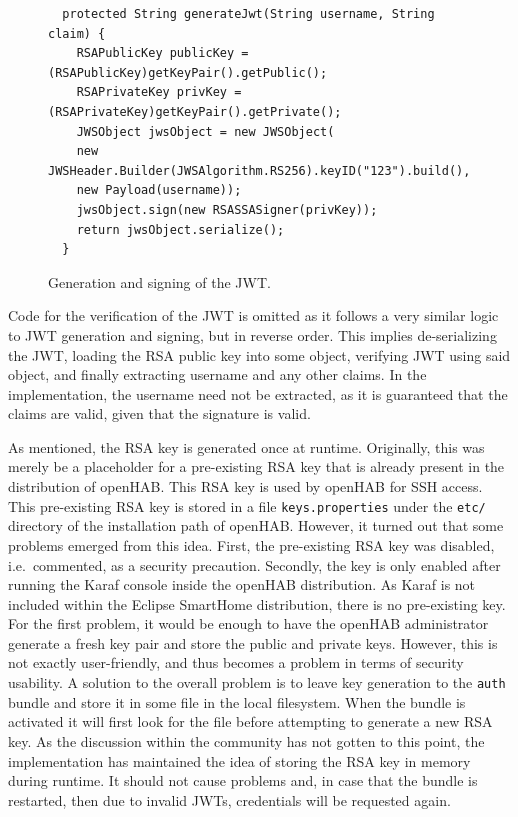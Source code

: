 \documentclass[12pt]{article}
\begin{document}
\begin{figure} [htb]
\begin{lstlisting}
  protected String generateJwt(String username, String claim) {
    RSAPublicKey publicKey = (RSAPublicKey)getKeyPair().getPublic();
    RSAPrivateKey privKey = (RSAPrivateKey)getKeyPair().getPrivate();
    JWSObject jwsObject = new JWSObject(
    new JWSHeader.Builder(JWSAlgorithm.RS256).keyID("123").build(),
    new Payload(username));
    jwsObject.sign(new RSASSASigner(privKey));
    return jwsObject.serialize();	
  }    
\end{lstlisting}
\caption{Generation and signing of the JWT.}
\label{lst:rsa}
\end{figure}

Code for the verification of the JWT is omitted as it follows a very similar logic to JWT generation and signing, but in reverse order. This implies de-serializing the JWT, loading the RSA public key into some object, verifying JWT using said object, and finally extracting username and any other claims. In the implementation, the username need not be extracted, as it is guaranteed that the claims are valid, given that the signature is valid.

As mentioned, the RSA key is generated once at runtime. Originally, this was merely be a placeholder for a pre-existing RSA key that is already present in the distribution of openHAB. This RSA key is used by openHAB for SSH access. This pre-existing RSA key is stored in a file \texttt{keys.properties} under the \texttt{etc/} directory of the installation path of openHAB. However, it turned out that some problems emerged from this idea. First, the pre-existing RSA key was disabled, i.e.\ commented, as a security precaution. Secondly, the key is only enabled after running the Karaf console inside the openHAB distribution. As Karaf is not included within the Eclipse SmartHome distribution, there is no pre-existing key. For the first problem, it would be enough to have the openHAB administrator generate a fresh key pair and store the public and private keys. However, this is not exactly user-friendly, and thus becomes a problem in terms of security usability. A solution to the overall problem is to leave key generation to the \texttt{auth} bundle and store it in some file in the local filesystem. When the bundle is activated it will first look for the file before attempting to generate a new RSA key. As the discussion within the community has not gotten to this point, the implementation has maintained the idea of storing the RSA key in memory during runtime. It should not cause problems and, in case that the bundle is restarted, then due to invalid JWTs, credentials will be requested again.
\end{document}
